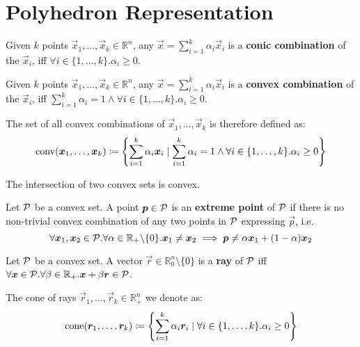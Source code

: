 \section{Polyhedron Representation}\label{sec:preliminaries_poly}

\begin{definition}
Given $k$ points $\vec{x}_1, \dots, \vec{x}_k \in \mathbb{R}^n$, any $\vec{x} = \sum_{i=1}^{k} \alpha_i \vec{x}_i$ is a \textbf{conic combination} of the $\vec{x}_i$, iff $\forall i \in \{1, \dots, k\}. \alpha_i \geq 0$.
\end{definition}

\begin{definition}\label{def:convex}
Given $k$ points $\vec{x}_1, \dots, \vec{x}_k \in \mathbb{R}^n$, any $\vec{x} = \sum_{i=1}^{k} \alpha_i \vec{x}_i$ is a \textbf{convex combination} of the $\vec{x}_i$, iff $\sum_{i=1}^{k} \alpha_i = 1 \land \forall i \in \{1, \dots, k\}. \alpha_i \geq 0$.

The set of all convex combinations of $\vec{x}_1, \dots, \vec{x}_k$ is therefore defined as:
\begin{equation*}
\operatorname{conv}({\bm{x}}_1, \dots, {\bm{x}}_k) \coloneqq \left\{\sum_{i=1}^{k} \alpha_i {\bm{x}}_i \mid \sum_{i=1}^{k} \alpha_i = 1 \land \forall i \in \{1, \dots, k\}. \alpha_i \geq 0 \right\}
\end{equation*}
\end{definition}

\begin{corollary}\label{cor:intersection_convex}
The intersection of two convex sets is convex.
\end{corollary}

\begin{definition}
Let $\mathcal{P}$ be a convex set. A point ${\bm{p}} \in \mathcal{P}$ is an \textbf{extreme point} of $\mathcal{P}$ if there is no non-trivial convex combination of any two points in $\mathcal{P}$ expressing $\vec{p}$, i.e.
\begin{equation*}
\forall {\bm{x}}_1, {\bm{x}}_2 \in \mathcal{P}. \forall \alpha \in \mathbb{R}_+ \backslash \{0\}. {\bm{x}}_1 \neq {\bm{x}}_2 \implies {\bm{p}} \neq \alpha {\bm{x}}_1 + (1 - \alpha) {\bm{x}}_2
\end{equation*}
\end{definition}

\begin{definition}\label{def:rays}
Let $\mathcal{P}$ be a convex set. A vector $\vec{r} \in \mathbb{R}_0^n \setminus \{0\}$ is a \textbf{ray} of $\mathcal{P}$ iff $\forall {\bm{x}} \in \mathcal{P}. \forall \beta \in \mathbb{R}_+. {\bm{x}} + \beta {\bm{r}} \in \mathcal{P}$.

The cone of rays $\vec{r}_1, \dots, \vec{r}_k \in \mathbb{R}_+^n$ we denote as:
\begin{equation*}
\operatorname{cone}({\bm{r}}_1, \dots, {\bm{r}}_k) \coloneqq \left\{ \sum_{i=1}^{k} \alpha_i {\bm{r}}_i \mid \forall i \in \{1, \dots, k\}. \alpha_i \geq 0 \right\}
\end{equation*}
\end{definition}

